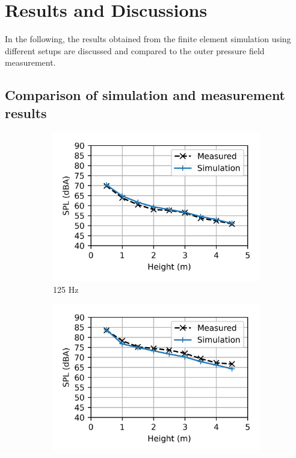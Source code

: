 \chapter{Results and Discussions}
\label{chap:results}

In the following, the results obtained from the finite element simulation using different setups are discussed and compared to the outer pressure field measurement.

\section{Comparison of simulation and measurement results}



\begin{figure}[H]
	\centering
	\begin{subfigure}[b]{0.49\textwidth}
		\centering
		\includegraphics{fig/chap5/initial_model/third_octave_over_height/125_Hz.png}
		\caption{125 Hz}
	\end{subfigure}
	\hfill
	\begin{subfigure}[b]{0.49\textwidth}
		\centering
		\includegraphics{fig/chap5/initial_model/third_octave_over_height/400_Hz.png}

\end{subfigure}
\end{figure}
